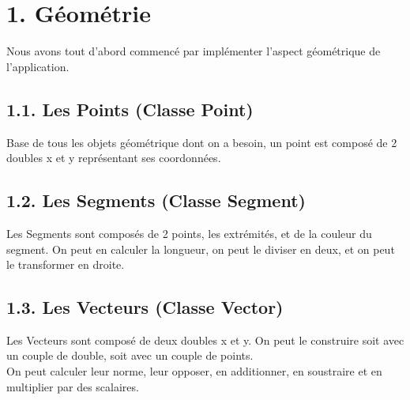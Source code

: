 \documentclass[a4paper,12pt]{report}	%
\begin{document}
\newpage

	{\section*{1. Géométrie}}
	  Nous avons tout d'abord commencé par implémenter l'aspect géométrique de l'application.\\
	
	{\subsection*{1.1. Les Points (Classe Point)}}
	  Base de tous les objets géométrique dont on a besoin, un point est composé de 2 doubles x et y représentant ses coordonnées.\\
	
	{\subsection*{1.2. Les Segments (Classe Segment)}}
      Les Segments sont composés de 2 points, les extrémités, et de la couleur du segment. On peut en calculer la longueur, on peut le diviser en deux, et on peut le transformer en droite.\\
    
    {\subsection*{1.3. Les Vecteurs (Classe Vector)}}
      Les Vecteurs sont composé de deux doubles x et y. On peut le construire soit avec un couple de double, soit avec un couple de points. \\
    On peut calculer leur norme, leur opposer, en additionner, en soustraire et en multiplier par des scalaires.\\
    
\end{document}

